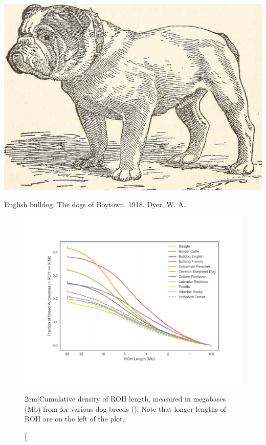 {{  \begin{marginfigure}[-3cm]
  \begin{center}
    \includegraphics[width=
    \textwidth]{illustration_images/alleles_genotypes/english_bulldog/14752595581_4330377c97_z.jpg}
\end{center}
\caption{English bulldog. The dogs of Boytown. 1918.  Dyer, W. A.} \label{fig:bulldog}
\end{marginfigure}
  \begin{figure}
  \begin{center}
    \includegraphics[width= \textwidth]{figures/sharing_relatives/dog_FROH_dist.pdf}
\end{center}
\caption[][2cm]{Cumulative density of ROH length, measured in megabases (Mb) from \citet{Sams:18} for various
  dog breeds (\PLOSccBY). Note that longer lengths of ROH are on the left of the plot.} \label{fig:dog_FOH_dist}
\end{figure}

}}

